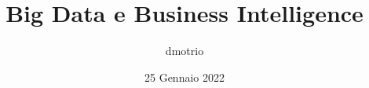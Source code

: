\documentclass{article}
\begin{document}
    \author{dmotrio}
    \title{Big Data e Business Intelligence}
    \date{25 Gennaio 2022}

    \maketitle
    \tableofcontents

    \listoffigures
    \listoftables


    
    
    

    

    

    

    
    
    

    

    

    
\end{document}
